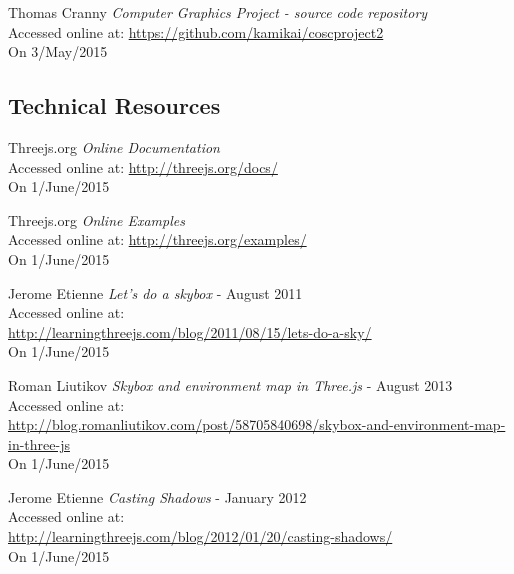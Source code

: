 \begin{thebibliography}{99}

    Thomas Cranny
    \textit{Computer Graphics Project - source code repository}\\
    Accessed online at:
    \href{https://github.com/kamikai/cosc_project2}{https://github.com/kamikai/cosc{\textunderscore}project2}\\
    On 3/May/2015

\subsection{Technical Resources}
\label{ref:technical_resources}

        Threejs.org
        \textit{Online Documentation}\\
        Accessed online at:
        \href{http://threejs.org/docs/}{http://threejs.org/docs/}\\
        On 1/June/2015

        Threejs.org
        \textit{Online Examples}\\
        Accessed online at:
        \href{http://threejs.org/examples/}{http://threejs.org/examples/}\\
        On 1/June/2015

        Jerome Etienne
        \textit{Let's do a skybox} - August 2011 \\
        Accessed online at: \\
        \href{http://learningthreejs.com/blog/2011/08/15/lets-do-a-sky/}{http://learningthreejs.com/blog/2011/08/15/lets-do-a-sky/}\\
        On 1/June/2015

        Roman Liutikov
        \textit{Skybox and environment map in Three.js} - August 2013 \\
        Accessed online at: \\
        \href{http://blog.romanliutikov.com/post/58705840698/skybox-and-environment-map-in-three-js}{http://blog.romanliutikov.com/post/58705840698/skybox-and-environment-map-in-three-js}\\
        On 1/June/2015

        Jerome Etienne
        \textit{Casting Shadows} - January 2012 \\
        Accessed online at: \\
        \href{http://learningthreejs.com/blog/2012/01/20/casting-shadows/}{http://learningthreejs.com/blog/2012/01/20/casting-shadows/}\\
        On 1/June/2015


\end{thebibliography}
